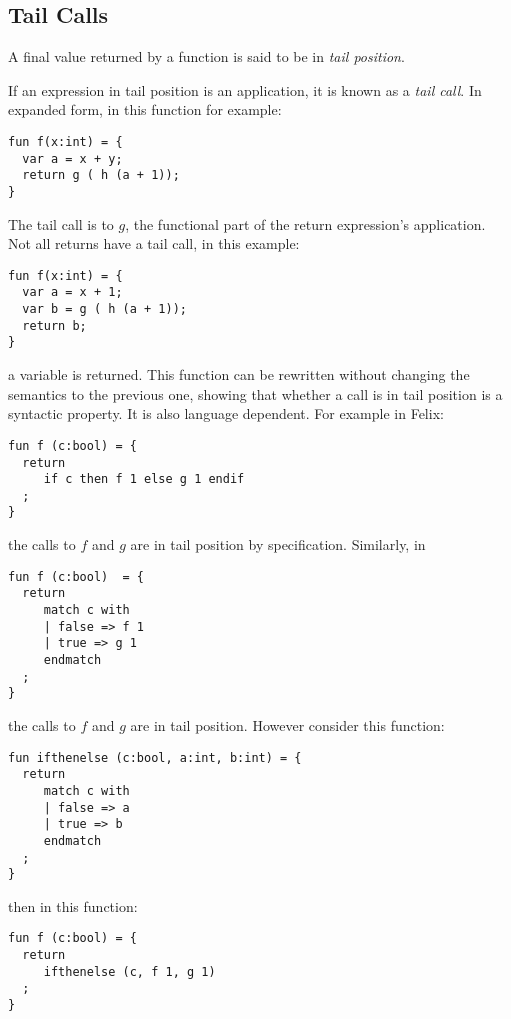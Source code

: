 \documentclass[oneside]{book}
\begin{document}
\subsection{Tail Calls}

A final value returned by a function is said to be in
{\em tail position}. 

If an expression in tail position is an application,
it is known as a {\em tail call}. 
In expanded form, in this function for example:

\begin{verbatim}
fun f(x:int) = {
  var a = x + y;
  return g ( h (a + 1));
}
\end{verbatim}

The tail call is to $g$, the functional part of the return
expression's application. Not all returns have a tail call,
in this example:

\begin{verbatim}
fun f(x:int) = {
  var a = x + 1;
  var b = g ( h (a + 1));
  return b;
}
\end{verbatim}

a variable is returned. This function can be rewritten
without changing the semantics to the previous one,
showing that whether a call is in tail position is
a syntactic property. It is also language dependent.
For example in Felix:

\begin{verbatim}
fun f (c:bool) = {
  return
     if c then f 1 else g 1 endif
  ;
}
\end{verbatim}

the calls to $f$ and $g$ are in tail position
by specification. Similarly, in

\begin{verbatim}
fun f (c:bool)  = {
  return
     match c with
     | false => f 1 
     | true => g 1 
     endmatch
  ;
}
\end{verbatim}

the calls to $f$ and $g$ are in tail position. However consider
this function:

\begin{verbatim}
fun ifthenelse (c:bool, a:int, b:int) = {
  return
     match c with
     | false => a
     | true => b
     endmatch
  ;
}
\end{verbatim}

then in this function:

\begin{verbatim}
fun f (c:bool) = {
  return
     ifthenelse (c, f 1, g 1)
  ;
}
\end{verbatim}
\end{document}
